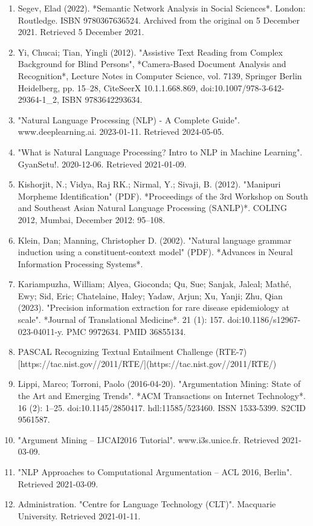 \begin{enumerate}
\item Segev, Elad (2022). *Semantic Network Analysis in Social Sciences*. London: Routledge. ISBN 9780367636524. Archived from the original on 5 December 2021. Retrieved 5 December 2021.  
\item Yi, Chucai; Tian, Yingli (2012). "Assistive Text Reading from Complex Background for Blind Persons", *Camera-Based Document Analysis and Recognition*, Lecture Notes in Computer Science, vol. 7139, Springer Berlin Heidelberg, pp. 15–28, CiteSeerX 10.1.1.668.869, doi:10.1007/978-3-642-29364-1_2, ISBN 9783642293634.  
\item "Natural Language Processing (NLP) - A Complete Guide". www.deeplearning.ai. 2023-01-11. Retrieved 2024-05-05.  
\item "What is Natural Language Processing? Intro to NLP in Machine Learning". GyanSetu!. 2020-12-06. Retrieved 2021-01-09.  
\item Kishorjit, N.; Vidya, Raj RK.; Nirmal, Y.; Sivaji, B. (2012). "Manipuri Morpheme Identification" (PDF). *Proceedings of the 3rd Workshop on South and Southeast Asian Natural Language Processing (SANLP)*. COLING 2012, Mumbai, December 2012: 95–108.  
\item Klein, Dan; Manning, Christopher D. (2002). "Natural language grammar induction using a constituent-context model" (PDF). *Advances in Neural Information Processing Systems*.  
\item Kariampuzha, William; Alyea, Gioconda; Qu, Sue; Sanjak, Jaleal; Mathé, Ewy; Sid, Eric; Chatelaine, Haley; Yadaw, Arjun; Xu, Yanji; Zhu, Qian (2023). "Precision information extraction for rare disease epidemiology at scale". *Journal of Translational Medicine*. 21 (1): 157. doi:10.1186/s12967-023-04011-y. PMC 9972634. PMID 36855134.  
\item PASCAL Recognizing Textual Entailment Challenge (RTE-7) [https://tac.nist.gov//2011/RTE/](https://tac.nist.gov//2011/RTE/)
\item Lippi, Marco; Torroni, Paolo (2016-04-20). "Argumentation Mining: State of the Art and Emerging Trends". *ACM Transactions on Internet Technology*. 16 (2): 1–25. doi:10.1145/2850417. hdl:11585/523460. ISSN 1533-5399. S2CID 9561587.  
\item "Argument Mining – IJCAI2016 Tutorial". www.i3s.unice.fr. Retrieved 2021-03-09.  
\item "NLP Approaches to Computational Argumentation – ACL 2016, Berlin". Retrieved 2021-03-09.  
\item Administration. "Centre for Language Technology (CLT)". Macquarie University. Retrieved 2021-01-11.  

\end{enumerate}
